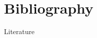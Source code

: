 \documentclass[compress]{beamer}
\begin{document}
\appendix
{}


\section{Bibliography}
\begin{frame}[allowframebreaks]{Literature}


\end{frame}


\end{document}
